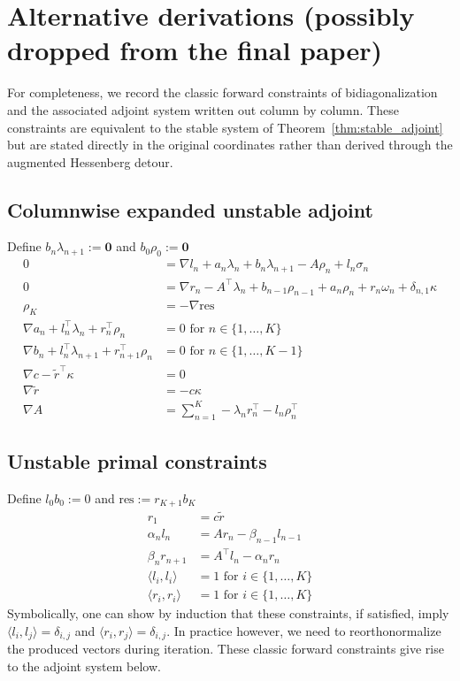 \documentclass[a4paper,12pt]{article}
\theoremstyle{definition}
\begin{document}
\section{Alternative derivations (possibly dropped from the final paper)}\label{app:alt}
For completeness, we record the classic forward constraints of bidiagonalization and the associated adjoint system written out column by column. These constraints are equivalent to the stable system of Theorem~\ref{thm:stable_adjoint} but are stated directly in the original coordinates rather than derived through the augmented Hessenberg detour.

\subsection{Columnwise expanded unstable adjoint}\label{app:columnwise}
Define $b_n\lambda_{n+1} := \mathbf{0}$ and $b_0\rho_0:=\mathbf{0}$
\begin{align}
0 &= \nabla l_n + a_n\lambda_n + b_n\lambda_{n+1} - A\rho_n + l_n\sigma_n
\\
0 &= \nabla r_n - A^\top\lambda_n + b_{n-1}\rho_{n-1} + a_n\rho_n + r_n\omega_n + \delta_{n,1} \kappa
\\
\rho_K &= - \nabla \text{res}
\\
\nabla a_n + l_n^\top\lambda_n + r_n^\top\rho_n &= 0 \text{ for } n \in \{1, \dots, K\}
\\
\nabla b_n + l_n^\top \lambda_{n+1} + r_{n+1}^\top \rho_{n} &= 0 \text{ for } n \in \{1, \dots, K-1\}
\\
\nabla c - \tilde r^\top\kappa &= 0
\\
\nabla \tilde r &= -c\kappa 
\\
\nabla A &= \sum_{n=1}^K -\lambda_n r_n^\top -l_n\rho_n^\top
\end{align}

\subsection{Unstable primal constraints}
Define $l_{0}b_{0} := 0$ and $\text{res} := r_{K+1} b_K$
\begin{align*}
    r_1 &= c\tilde r
    \\
    \alpha_n l_n &= Ar_n - \beta_{n-1}l_{n-1}
    \\
    \beta_n r_{n+1} &= A^\top l_n - \alpha_n r_n 
    \\
    \langle l_i, l_i \rangle &= 1 \text{ for } i \in \{1, \dots, K\}
    \\
    \langle r_i, r_i \rangle &= 1 \text{ for } i \in \{1, \dots, K\}
\end{align*}
Symbolically, one can show by induction that these constraints, if satisfied, imply $\langle l_i, l_j \rangle =\delta_{i,j}$ and $\langle r_i, r_j \rangle =\delta_{i,j}$. In practice however, we need to reorthonormalize the produced vectors during iteration. These classic forward constraints give rise to the adjoint system below.
\end{document}
